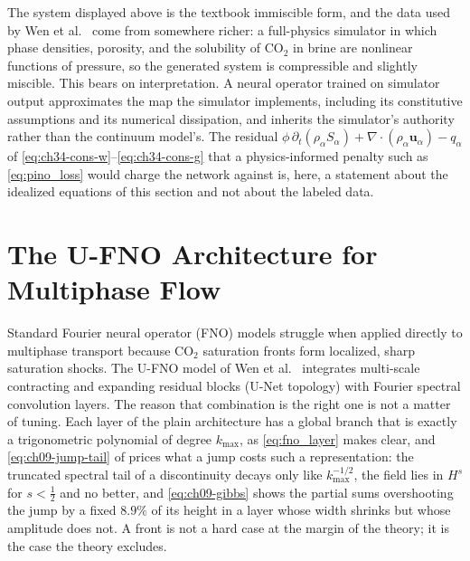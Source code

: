 The system displayed above is the textbook immiscible form, and the data used by
Wen et al.~\cite{wen2022ufno} come from somewhere richer: a full-physics simulator
in which phase densities, porosity, and the solubility of $\mathrm{CO}_2$ in brine
are nonlinear functions of pressure, so the generated system is compressible and
slightly miscible. This bears on interpretation. A neural operator trained on
simulator output approximates the map the simulator implements, including its
constitutive assumptions and its numerical dissipation, and inherits the
simulator's authority rather than the continuum model's. The residual
$\phi\,\partial_t(\rho_\alpha S_\alpha) + \nabla\cdot(\rho_\alpha\mathbf{u}_\alpha) - q_\alpha$
of \eqref{eq:ch34-cons-w}--\eqref{eq:ch34-cons-g} that a physics-informed penalty
such as \eqref{eq:pino_loss} would charge the network against is, here, a statement
about the idealized equations of this section and not about the labeled data.

\section{The U-FNO Architecture for Multiphase Flow}

Standard Fourier neural operator (FNO) models struggle when applied directly to
multiphase transport because $\mathrm{CO}_2$ saturation fronts form localized,
sharp saturation shocks. The U-FNO model of Wen et al.~\cite{wen2022ufno}
integrates multi-scale contracting and expanding residual blocks (U-Net topology)
with Fourier spectral convolution layers. The reason that
combination is the right one is not a matter of tuning. Each layer of the plain
architecture \cite{li2021fourier} has a global branch that is exactly a
trigonometric polynomial of degree $k_{\max}$, as \eqref{eq:fno_layer} makes
clear, and \eqref{eq:ch09-jump-tail} of 
prices what a jump costs such a representation: the truncated spectral tail of a
discontinuity decays only like $k_{\max}^{-1/2}$, the field lies in $H^s$ for
$s < \tfrac12$ and no better, and \eqref{eq:ch09-gibbs} shows the partial sums
overshooting the jump by a fixed $8.9\%$ of its height in a layer whose width
shrinks but whose amplitude does not. A front is not a hard case at the margin of
the theory; it is the case the theory excludes.


